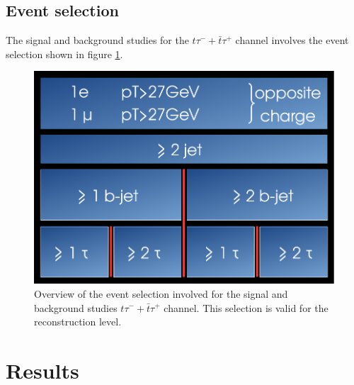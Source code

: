 \section{Event selection}\label{eventselection}
The signal and background studies for the $t\tau^{-}+\bar{t}\tau^{+}$ channel involves the event selection shown in figure \ref{selection}.\newline
%
\begin{figure}[htbp]                                 
 \begin{center}                                       
  \includegraphics[width=0.45\linewidth]{figures/selection.pdf} 
   \caption[Overview of the event selection.]{Overview of the event selection involved for the signal and background studies $t\tau^{-}+\bar{t}\tau^{+}$ channel. This selection is valid for the reconstruction level.}
  \label{selection}                                    
 \end{center}
\end{figure}
%
\chapter{Results}
\appendix
